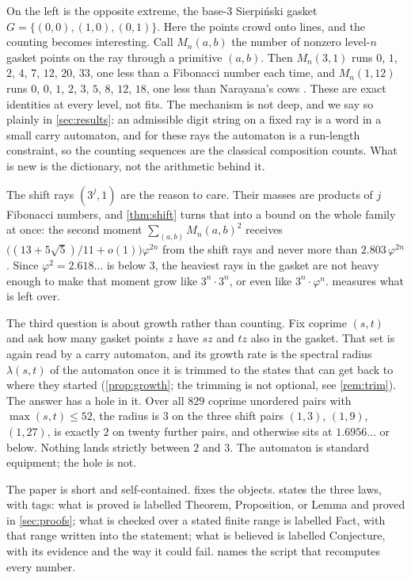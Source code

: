 \documentclass[11pt]{amsart}
\theoremstyle{definition}
\theoremstyle{remark}
\begin{document}
On the left is the opposite extreme, the base-3 Sierpi\'nski gasket $G=\{(0,0),(1,0),(0,1)\}$. Here the points crowd onto lines, and the counting becomes interesting. Call $M_n(a,b)$ the number of nonzero level-$n$ gasket points on the ray through a primitive $(a,b)$. Then $M_n(3,1)$ runs $0$, $1$, $2$, $4$, $7$, $12$, $20$, $33$, one less than a Fibonacci number each time, and $M_n(1,12)$ runs $0$, $0$, $1$, $2$, $3$, $5$, $8$, $12$, $18$, one less than Narayana's cows \cite{oeisA000930}. These are exact identities at every level, not fits. The mechanism is not deep, and we say so plainly in \cref{sec:results}: an admissible digit string on a fixed ray is a word in a small carry automaton, and for these rays the automaton is a run-length constraint, so the counting sequences are the classical composition counts. What is new is the dictionary, not the arithmetic behind it.

The shift rays $(3^j,1)$ are the reason to care. Their masses are products of $j$ Fibonacci numbers, and \cref{thm:shift} turns that into a bound on the whole family at once: the second moment $\sum_{(a,b)}M_n(a,b)^2$ receives $\bigl((13+5\sqrt5)/11+o(1)\bigr)\varphi^{2n}$ from the shift rays and never more than $2.803\,\varphi^{2n}$. Since $\varphi^2=2.618\ldots$ is below $3$, the heaviest rays in the gasket are not heavy enough to make that moment grow like $3^{n}\cdot 3^{n}$, or even like $3^{n}\cdot\varphi^{n}$.  measures what is left over.

The third question is about growth rather than counting. Fix coprime $(s,t)$ and ask how many gasket points $z$ have $sz$ and $tz$ also in the gasket. That set is again read by a carry automaton, and its growth rate is the spectral radius $\lambda(s,t)$ of the automaton once it is trimmed to the states that can get back to where they started (\cref{prop:growth}; the trimming is not optional, see \cref{rem:trim}). The answer has a hole in it. Over all $829$ coprime unordered pairs with $\max(s,t)\le 52$, the radius is $3$ on the three shift pairs $(1,3)$, $(1,9)$, $(1,27)$, is exactly $2$ on twenty further pairs, and otherwise sits at $1.6956\ldots$ or below. Nothing lands strictly between $2$ and $3$. The automaton is standard equipment; the hole is not.

The paper is short and self-contained.  fixes the objects.  states the three laws, with tags: what is proved is labelled Theorem, Proposition, or Lemma and proved in \cref{sec:proofs}; what is checked over a stated finite range is labelled Fact, with that range written into the statement; what is believed is labelled Conjecture, with its evidence and the way it could fail.  names the script that recomputes every number.
\end{document}
